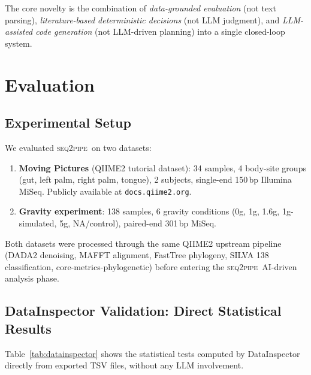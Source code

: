 \documentclass[11pt,a4paper]{article}
\newcommand{\seqpipe}{\textsc{seq2pipe}}
\begin{document}
The core novelty is the combination of
\emph{data-grounded evaluation} (not text parsing),
\emph{literature-based deterministic decisions} (not LLM judgment),
and \emph{LLM-assisted code generation} (not LLM-driven planning)
into a single closed-loop system.

\section{Evaluation}
\label{sec:eval}

\subsection{Experimental Setup}

We evaluated \seqpipe\ on two datasets:
\begin{enumerate}
  \item \textbf{Moving Pictures} (QIIME2 tutorial dataset):
    34 samples, 4 body-site groups (gut, left palm, right palm, tongue),
    2 subjects, single-end 150\,bp Illumina MiSeq.
    Publicly available at \texttt{docs.qiime2.org}.
  \item \textbf{Gravity experiment}:
    138 samples, 6 gravity conditions (0g, 1g, 1.6g, 1g-simulated, 5g, NA/control),
    paired-end 301\,bp MiSeq.
\end{enumerate}

Both datasets were processed through the same QIIME2 upstream pipeline
(DADA2 denoising, MAFFT alignment, FastTree phylogeny, SILVA 138
classification, core-metrics-phylogenetic) before entering the
\seqpipe\ AI-driven analysis phase.

\subsection{DataInspector Validation: Direct Statistical Results}
\label{sec:eval-datainspector}

Table~\ref{tab:datainspector} shows the statistical tests computed
by DataInspector directly from exported TSV files, without any LLM
involvement.
\end{document}
